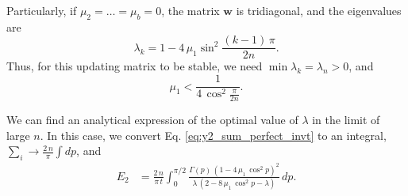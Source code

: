 \documentclass[reprint]{revtex4-1}
\newcommand{\Err}{E}
\begin{document}
Particularly, if $\mu_2 = \dots = \mu_b = 0$,
the matrix $\mathbf w$ is tridiagonal,
and the eigenvalues are
\begin{equation}
  \lambda_k = 1 - 4 \, \mu_1 \sin^2 \frac{(k - 1) \, \pi}{2n}.
\label{eq:wtridiag_eigenvalue}
\end{equation}
%
Thus, for this updating matrix to be stable,
we need
$\min \lambda_k = \lambda_n > 0$,
and
$$
\mu_1 < \frac{1}{4 \, \cos^2\frac{\pi}{2n} }.
$$



We can find an analytical expression
of the optimal value of $\lambda$
in the limit of large $n$.
%
In this case,
we convert Eq.
\eqref{eq:y2_sum_perfect_invt}
to an integral,
$\sum_i \to \frac{2 \, n}{\pi} \int dp$, and
$$
\begin{aligned}
\Err_2
&=
\frac{2 \, n}{\pi \, t}
\int_0^{\pi/2}
\frac{ \Gamma(p) \, \left(1 - 4 \, \mu_1 \, \cos^2 p \right)^2 }
{ \lambda \, \left(2 - 8 \, \mu_1 \, \cos^2 p - \lambda \right) }
\, dp.
\end{aligned}
$$
\end{document}
